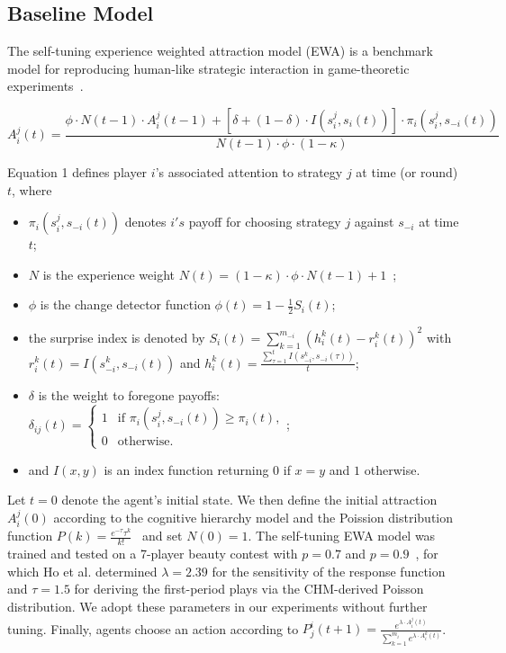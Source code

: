 \documentclass[runningheads]{llncs}
\begin{document}
\subsection{Baseline Model}
The self-tuning experience weighted attraction model (EWA) is a benchmark model for reproducing human-like strategic interaction in game-theoretic experiments~\cite{ho2007self}.

\begin{equation}
A^j_i(t)=\frac{\phi \cdot N(t-1) \cdot A^j_i(t-1)+[\delta+(1-\delta) \cdot I(s^j_i,s_i(t))] \cdot \pi_i(s^j_i,s_{-i}(t))}{N(t-1) \cdot \phi \cdot (1-\kappa)}
\end{equation}

Equation 1 defines player $i$'s associated attention to strategy $j$ at time (or round) $t$, where
\begin{itemize}
    \item $\pi_i(s^j_i,s_{-i}(t))$ denotes $i's$ payoff for choosing strategy $j$ against $s_{-i}$ at time $t$;
    \item $N$ is the experience weight $N(t) = (1-\kappa) \cdot \phi \cdot N(t-1)+1$~\cite{CAMERER2002137};
    \item $\phi$ is the change detector function $\phi(t)=1-\frac{1}{2}S_i(t)$;
    \item the surprise index is denoted by $S_i(t)=\sum^{m_{-i}}_{k=1}{(h^k_i(t)-r^k_i(t))^2}$ with\\ $r^k_i(t)=I(s^k_{-i},s_{-i}(t))$ and $h^k_i(t)=\frac{\sum^{t}_{\tau=1}{I(s^k_{-i},s_{-i}(\tau))}}{t}$;
    \item $\delta$ is the weight to foregone payoffs: $\delta_{ij}(t)= \begin{cases}
        1 & \text{if } \pi_i(s^j_i,s_{-i}(t)) \geq \pi_i(t),\\
        0 & \text{otherwise.}
    \end{cases}$;
    \item and $I(x,y)$ is an index function returning  $0$ if $x=y$ and $1$ otherwise.
\end{itemize}
Let $t=0$ denote the agent's initial state. We then define the initial attraction $A^j_i(0)$ according to the cognitive hierarchy model and the Poission distribution function $P(k) = \frac{e^{-\tau}\tau^k}{k!}$~\cite{camerer2004cognitive} and set $N(0)=1$. The self-tuning EWA model was trained and tested on a 7-player beauty contest with $p=0.7$ and $p=0.9$~\cite{ho1998iterated}, for which Ho et al. determined $\lambda=2.39$ for the sensitivity of the response function and $\tau=1.5$ for deriving the first-period plays via the CHM-derived Poisson distribution. We adopt these parameters in our experiments without further tuning. Finally, agents choose an action according to $P^i_j(t+1) = \frac{e^{\lambda \cdot A^j_i(t)}}{\sum^{m_i}_{k=1}{e^{\lambda \cdot A^k_i(t)}}}$.
\end{document}
